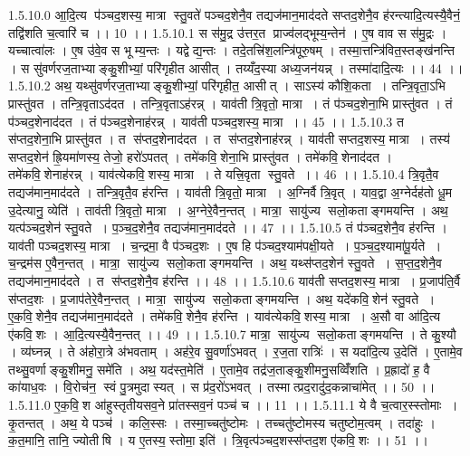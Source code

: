 1.5.10.0
आ॒दि॒त्य प॑ञ्चद॒शस्य॒ मात्रा स्तु॒वते॑ पञ्चद॒शेनै॒व तद्यज॑मान॒माद॑दते सप्तद॒शेनै॒व ह॑रन्त्यादि॒त्यस्यै॒वैनं॒ तद्वि॑शति च॒त्वारि॑ च ।। 10 ।।
1.5.10.1
स स॑मु॒द्र उ॑त्तर॒त प्राज्व॑लद्भूम्य॒न्तेन॑ । ए॒ष वाव स स॑मु॒द्रः । यच्चात्वा॑लः । ए॒ष उ॑वे॒व स भूम्य॒न्तः । यद्वेद्य॒न्तः । तदे॒तत्त्रि॑श॒लन्त्रि॑पूरु॒षम् । तस्मा॒त्तन्त्रि॑वित॒स्तङ्ख॑नन्ति । स सु॑वर्णरज॒ताभ्याङ्कु॒शीभ्यां॒ परि॑गृहीत आसीत् । तय्यँद॒स्या अध्य॒जन॑यन्न् । तस्मा॑दादि॒त्यः ।। 44 ।।
1.5.10.2
अथ॒ यथ्सु॑वर्णरज॒ताभ्याङ्कु॒शीभ्यां॒ परि॑गृहीत॒ आसीत् । साऽस्य॑ कौशि॒कता । तन्त्रि॒वृता॒ऽभि प्रास्तु॑वत । तन्त्रि॒वृताऽद॑दत । तन्त्रि॒वृताऽह॑रन्न् । याव॑ती त्रि॒वृतो॒ मात्रा । तं प॑ञ्चद॒शेना॒भि प्रास्तु॑वत । तं प॑ञ्चद॒शेनाद॑दत । तं प॑ञ्चद॒शेनाह॑रन्न् । याव॑ती पञ्चद॒शस्य॒ मात्रा ।। 45 ।।
1.5.10.3
त स॑प्तद॒शेना॒भि प्रास्तु॑वत । त स॑प्तद॒शेनाद॑दत । त स॑प्तद॒शेनाह॑रन्न् । याव॑ती सप्तद॒शस्य॒ मात्रा । तस्य॑ सप्तद॒शेन॑ ह्रि॒यमा॑णस्य॒ तेजो॒ हरो॑ऽपतत् । तमे॑कवि॒॒शेना॒भि प्रास्तु॑वत । तमे॑कवि॒॒शेनाद॑दत । तमे॑कवि॒॒शेनाह॑रन्न् । याव॑त्येकवि॒॒शस्य॒ मात्रा । ते यत्त्रि॒वृता स्तु॒वते ।। 46 ।।
1.5.10.4
त्रि॒वृतै॒व तद्यज॑मान॒माद॑दते । तन्त्रि॒वृतै॒व ह॑रन्ति । याव॑ती त्रि॒वृतो॒ मात्रा । अ॒ग्निर्वै त्रि॒वृत् । याव॒द्वा अ॒ग्नेर्दह॑तो धू॒म उ॒देत्यानु॒ व्येति॑ । ताव॑ती त्रि॒वृतो॒ मात्रा । अ॒ग्नेरे॒वैन॒न्तत् । मात्रा॒॒ सायु॑ज्य सलो॒कताङ्गमयन्ति । अथ॒ यत्प॑ञ्चद॒शेन॑ स्तु॒वते । प॒ञ्च॒द॒शेनै॒व तद्यज॑मान॒माद॑दते ।। 47 ।।
1.5.10.5
तं प॑ञ्चद॒शेनै॒व ह॑रन्ति । याव॑ती पञ्चद॒शस्य॒ मात्रा । च॒न्द्रमा॒ वै प॑ञ्चद॒शः । ए॒ष हि प॑ञ्चद॒श्याम॑पक्षी॒यते । प॒ञ्च॒द॒श्यामा॑पू॒र्यते । च॒न्द्रम॑स ए॒वैन॒न्तत् । मात्रा॒॒ सायु॑ज्य सलो॒कताङ्गमयन्ति । अथ॒ यथ्स॑प्तद॒शेन॑ स्तु॒वते । स॒प्त॒द॒शेनै॒व तद्यज॑मान॒माद॑दते । त स॑प्तद॒शेनै॒व ह॑रन्ति ।। 48 ।।
1.5.10.6
याव॑ती सप्तद॒शस्य॒ मात्रा । प्र॒जाप॑ति॒र्वै स॑प्तद॒शः । प्र॒जाप॑तेरे॒वैन॒न्तत् । मात्रा॒॒ सायु॑ज्य सलो॒कताङ्गमयन्ति । अथ॒ यदे॑कवि॒॒शेन॑ स्तु॒वते । ए॒क॒वि॒॒शेनै॒व तद्यज॑मान॒माद॑दते । तमे॑कवि॒॒शेनै॒व ह॑रन्ति । याव॑त्येकवि॒॒शस्य॒ मात्रा । अ॒सौ वा आ॑दि॒त्य ए॑कवि॒॒शः । आ॒दि॒त्यस्यै॒वैन॒न्तत् ।। 49 ।।
1.5.10.7
मात्रा॒॒ सायु॑ज्य सलो॒कताङ्गमयन्ति । ते कु॒श्यौ । व्य॑घ्नन्न् । ते अ॑होरा॒त्रे अ॑भवताम् । अह॑रे॒व सु॒वर्णा॑ऽभवत् । र॒ज॒ता रात्रिः॑ । स यदा॑दि॒त्य उ॒देति॑ । ए॒तामे॒व तथ्सु॒वर्णाङ्कु॒शीमनु॒ समे॑ति । अथ॒ यद॑स्त॒मेति॑ । ए॒तामे॒व तद्र॑ज॒ताङ्कु॒शीमनु॒सव्विँ॑शति । प्र॒ह्रादो॑ ह॒ वै का॑याध॒वः । वि॒रोच॑न॒॒ स्वं पु॒त्रमुदास्यत् । स प्र॑द॒रो॑ऽभवत् । तस्मात्प्रद॒रादु॑द॒कन्नाचा॑मेत् ।। 50 ।।
1.5.11.0
ए॒क॒वि॒॒श आ॑हुस्तृतीयसव॒ने प्रा॑तस्सव॒नं पञ्च॑ च ।। 11 ।।
1.5.11.1
ये वै च॒त्वार॒स्स्तोमाः । कृ॒तन्तत् । अथ॒ ये पञ्च॑ । कलि॒स्सः । तस्मा॒च्चतु॑ष्टोमः । तच्चतु॑ष्टोमस्य चतुष्टोम॒त्वम् । तदा॑हुः । क॒त॒मानि॒ तानि॒ ज्योती॑षि । य ए॒तस्य॒ स्तोमा॒ इति॑ । त्रि॒वृत्प॑ञ्चद॒शस्स॑प्तद॒श ए॑कवि॒॒शः ।। 51 ।।
